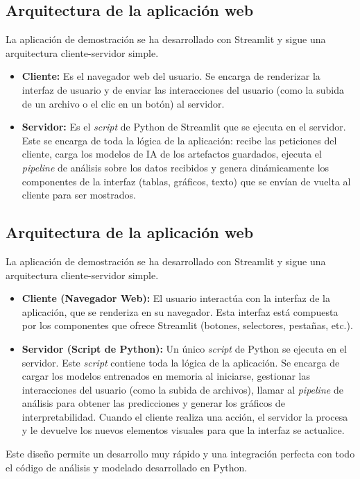 
\subsection{Arquitectura de la aplicación web}

La aplicación de demostración se ha desarrollado con Streamlit y sigue una arquitectura cliente-servidor simple.

\begin{itemize}
	\item \textbf{Cliente:} Es el navegador web del usuario. Se encarga de renderizar la interfaz de usuario y de enviar las interacciones del usuario (como la subida de un archivo o el clic en un botón) al servidor.
	
	\item \textbf{Servidor:} Es el \textit{script} de Python de Streamlit que se ejecuta en el servidor. Este se encarga de toda la lógica de la aplicación: recibe las peticiones del cliente, carga los modelos de IA de los artefactos guardados, ejecuta el \textit{pipeline} de análisis sobre los datos recibidos y genera dinámicamente los componentes de la interfaz (tablas, gráficos, texto) que se envían de vuelta al cliente para ser mostrados.
\end{itemize}


\subsection*{Arquitectura de la aplicación web}
La aplicación de demostración se ha desarrollado con Streamlit y sigue una arquitectura cliente-servidor simple.
\begin{itemize}
	\item \textbf{Cliente (Navegador Web):} El usuario interactúa con la interfaz de la aplicación, que se renderiza en su navegador. Esta interfaz está compuesta por los componentes que ofrece Streamlit (botones, selectores, pestañas, etc.).
	\item \textbf{Servidor (Script de Python):} Un único \textit{script} de Python se ejecuta en el servidor. Este \textit{script} contiene toda la lógica de la aplicación. Se encarga de cargar los modelos entrenados en memoria al iniciarse, gestionar las interacciones del usuario (como la subida de archivos), llamar al \textit{pipeline} de análisis para obtener las predicciones y generar los gráficos de interpretabilidad. Cuando el cliente realiza una acción, el servidor la procesa y le devuelve los nuevos elementos visuales para que la interfaz se actualice.
\end{itemize}
Este diseño permite un desarrollo muy rápido y una integración perfecta con todo el código de análisis y modelado desarrollado en Python.
